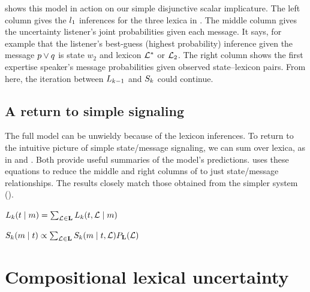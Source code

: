 \documentclass{article}
\begin{document}
 shows this model in action on our simple
disjunctive scalar implicature. The left column gives the
$\listenerOne$ inferences for the three lexica in
. The middle column gives the uncertainty
listener's joint probabilities given each message. It says, for
example that the listener's best-guess (highest probability) inference
given the message $\porq$ is state $w_{2}$ and lexicon $\LexStar$ or
$\Lex_{2}$. The right column shows the first expertise speaker's
message probabilities given observed state--lexicon pairs. From here,
the iteration between $\ListenerK[k-1]$ and $\SpeakerK$ could
continue.


\subsection{A return to simple signaling}\label{sec:return}

The full model can be unwieldy because of the lexicon inferences. To
return to the intuitive picture of simple state/message signaling, we
can sum over lexica, as in  and . Both provide
useful summaries of the model's predictions.  uses
these equations to reduce the middle and right columns of
 to just state/message relationships. The
results closely match those obtained from the simpler system
().
%
\begin{examples}
\item\label{lisnorm}%
  $\ListenerK(\state \given \msg)  = 
  \sum_{\Lex \in \LexSet} \ListenerK(\state, \Lex \given \msg)$
\item\label{spknorm}%
  $\SpeakerK(\msg \given \state) \propto 
  \sum_{\Lex \in \LexSet} \SpeakerK(\msg \given \state, \Lex)
  \LexPrior(\Lex)$
\end{examples}



\section{Compositional lexical uncertainty}\label{sec:composition}
\end{document}
